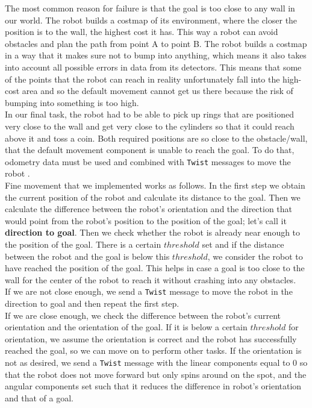 \documentclass[12pt,a4paper]{article}
\begin{document}
	The most common reason for failure is that the goal is too close to any wall in our world. The robot builds a costmap of its environment, where the closer the position is to the wall, the highest cost it has. This way a robot can avoid obstacles and plan the path from point A to point B. The robot builds a costmap in a way that it makes sure not to bump into anything, which means it also takes into account all possible errors in data from its detectors. This means that some of the points that the robot can reach in reality unfortunately fall into the high-cost area and so the default movement cannot get us there because the risk of bumping into something is too high. \\

	In our final task, the robot had to be able to pick up rings that are positioned very close to the wall and get very close to the cylinders so that it could reach above it and toss a coin. Both required positions are so close to the obstacle/wall, that the default movement component is unable to reach the goal. To do that, odometry data must be used and combined with \texttt{Twist} messages to move the robot . \\

	Fine movement that we implemented works as follows. In the first step we obtain the current position of the robot and calculate its distance to the goal. Then we calculate the difference between the robot's orientation and the direction that would point from the robot's position to the position of the goal; let's call it \textbf{direction to goal}. Then we check whether the robot is already near enough to the position of the goal. There is a certain $threshold$ set and if the distance between the robot and the goal is below this $threshold$, we consider the robot to have reached the position of the goal. This helps in case a goal is too close to the wall for the center of the robot to reach it without crashing into any obstacles. \\
	
	If we are not close enough, we send a \texttt{Twist} message to move the robot in the direction to goal and then repeat the first step. \\
	
	If we are close enough, we check the difference between the robot's current orientation and the orientation of the goal. If it is below a certain $threshold$ for orientation, we assume the orientation is correct and the robot has successfully reached the goal, so we can move on to perform other tasks. If the orientation is not as desired, we send a \texttt{Twist} message with the linear components equal to 0 so that the robot does not move forward but only spins around on the spot, and the angular components set such that it reduces the difference in robot's orientation and that of a goal. \\
\end{document}
